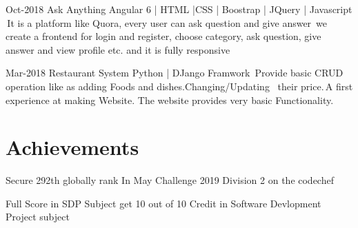 \documentclass[print]{cv-style}          %
\begin{document}
\begin{entrylist}
\entry
{Oct-2018}
{Ask Anything }
{Angular 6 | HTML |CSS | Boostrap | JQuery | Javascript}
{\textbullet\,It is a platform like Quora, every user can ask question and give answer\newline 
\textbullet\,we create a frontend for login and register, choose category, ask question, give \newline\, \hspace*{0.5ex}  answer and view profile etc. and it is fully responsive}
{\vspace{-0.3cm}}
\end{entrylist}
\begin{entrylist}
\entry
{Mar-2018}
{Restaurant System}
{Python | DJango Framwork}
{
\textbullet\,Provide basic CRUD operation like as adding Foods and dishes.Changing/Updating \newline\, \hspace*{0.5ex} their price.\newline \textbullet\,A first  experience at making Website. The website provides very basic Functionality.}
{\vspace{-0.3cm}}


\end{entrylist}

\vspace{0.1cm}
\section{Achievements}

\begin{entrylist}
\entry
{}
{Secure 292th globally rank}
{}
{In  May Challenge 2019 Division 2 on the codechef}

\end{entrylist}

\begin{entrylist}
\entry
{}
{Full Score in SDP Subject}
{}
{get 10 out of 10 Credit in Software Devlopment Project  subject}

\end{entrylist}
\end{document}
